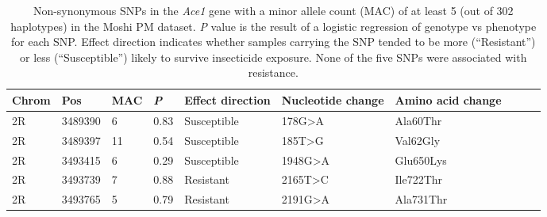 \documentclass[a4paper,12pt]{article}
\begin{document}
\begin{figure}[h]
	\label{FigS9}
\end{figure}

\clearpage


\begin{table}[!ht]
	\vspace{5cm}
	\footnotesize
    \centering
	\caption{Non-synonymous SNPs in the \textit{Ace1} gene with a minor allele count (MAC) of at least 5 (out of 302 haplotypes) in the Moshi PM dataset. \textit{P} value is the result of a logistic regression of genotype vs phenotype for each SNP. Effect direction indicates whether samples carrying the SNP tended to be more (``Resistant'') or less (``Susceptible'') likely to survive insecticide exposure. None of the five SNPs were associated with resistance.}
    \begin{tabular}{|l|l|l|l|l|l|l|l|l|l|}
    \hline
	\textbf{Chrom} & \textbf{Pos} & \textbf{MAC} & \textbf{\textit{P}} & \textbf{Effect direction} & \textbf{Nucleotide change} & \textbf{Amino acid change} \\ \hline
        2R & 3489390 & 6 & 0.83 & Susceptible & 178G>A & Ala60Thr \\ \hline
        2R & 3489397 & 11 & 0.54 & Susceptible & 185T>G & Val62Gly \\ \hline
        2R & 3493415 & 6 & 0.29 & Susceptible & 1948G>A & Glu650Lys \\ \hline
        2R & 3493739 & 7 & 0.88 & Resistant & 2165T>C & Ile722Thr \\ \hline
        2R & 3493765 & 5 & 0.79 & Resistant & 2191G>A & Ala731Thr \\ \hline
    \end{tabular}
\end{table}
\end{document}
